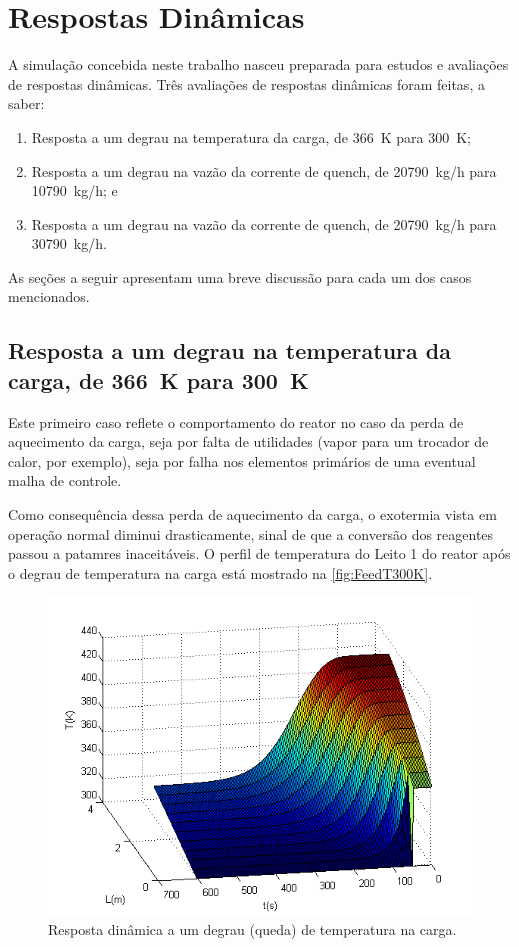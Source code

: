 \section{Respostas Dinâmicas} \label{sec:respostasdinamicas}

A simulação concebida neste trabalho nasceu preparada para estudos e avaliações
de respostas dinâmicas. Três avaliações de respostas dinâmicas foram feitas, a
saber:

\begin{enumerate}
  \item Resposta a um degrau na temperatura da carga, de \SI{366}{K} para
  \SI{300}{K};
  \item Resposta a um degrau na vazão da corrente de quench, de \SI{20790}{kg/h}
  para \SI{10790}{kg/h}; e
  \item Resposta a um degrau na vazão da corrente de quench, de \SI{20790}{kg/h}
  para \SI{30790}{kg/h}.
\end{enumerate}

As seções a seguir apresentam uma breve discussão para cada um dos casos
mencionados.

\subsection{Resposta a um degrau na temperatura da carga, de \SI{366}{K} para
\SI{300}{K}}
\label{sec:respostaaumdegrautemp}

Este primeiro caso reflete o comportamento do reator no caso da perda de
aquecimento da carga, seja por falta de utilidades (vapor para um trocador de
calor, por exemplo), seja por falha nos elementos primários de uma eventual
malha de controle.

Como consequência dessa perda de aquecimento da carga, o exotermia vista
em operação normal diminui drasticamente, sinal de que a conversão dos reagentes
passou a patamres inaceitáveis. O perfil de temperatura do Leito 1 do reator
após o degrau de temperatura na carga está mostrado na
\autoref{fig:FeedT300K}.

\begin{figure}[htb]
\centering
\includegraphics[scale=0.8]{images/Chap4/FeedT300K.png}
\caption{Resposta dinâmica a um degrau (queda) de temperatura na carga.}
\label{fig:FeedT300K}
\end{figure}

